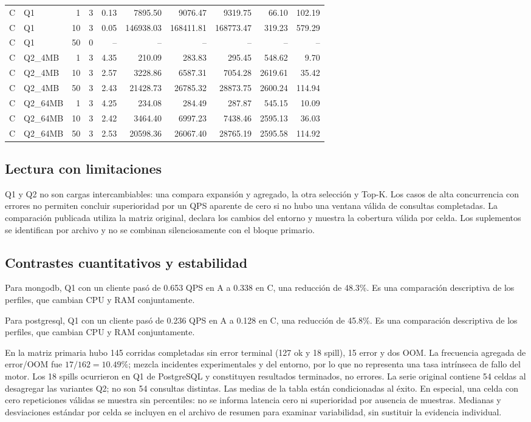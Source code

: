 \documentclass[11pt,letterpaper]{article}
\begin{document}
{\begin{longtable}{llrrrrrrrr}
C & Q1 & 1 & 3 & 0.13 & 7895.50 & 9076.47 & 9319.75 & 66.10 & 102.19\\
C & Q1 & 10 & 3 & 0.05 & 146938.03 & 168411.81 & 168773.47 & 319.23 & 579.29\\
C & Q1 & 50 & 0 & -- & -- & -- & -- & -- & --\\
C & Q2\_4MB & 1 & 3 & 4.35 & 210.09 & 283.83 & 295.45 & 548.62 & 9.70\\
C & Q2\_4MB & 10 & 3 & 2.57 & 3228.86 & 6587.31 & 7054.28 & 2619.61 & 35.42\\
C & Q2\_4MB & 50 & 3 & 2.43 & 21428.73 & 26785.32 & 28873.75 & 2600.24 & 114.94\\
C & Q2\_64MB & 1 & 3 & 4.25 & 234.08 & 284.49 & 287.87 & 545.15 & 10.09\\
C & Q2\_64MB & 10 & 3 & 2.42 & 3464.40 & 6997.23 & 7438.46 & 2595.13 & 36.03\\
C & Q2\_64MB & 50 & 3 & 2.53 & 20598.36 & 26067.40 & 28765.19 & 2595.58 & 114.92\\
\end{longtable}}
\subsection{Lectura con limitaciones}
Q1 y Q2 no son cargas intercambiables: una compara expansión y agregado, la otra selección y Top-K. Los casos de alta concurrencia con errores no permiten concluir superioridad por un QPS aparente de cero si no hubo una ventana válida de consultas completadas. La comparación publicada utiliza la matriz original, declara los cambios del entorno y muestra la cobertura válida por celda. Los suplementos se identifican por archivo y no se combinan silenciosamente con el bloque primario.
\subsection{Contrastes cuantitativos y estabilidad}
Para mongodb, Q1 con un cliente pasó de 0.653 QPS en A a 0.338 en C, una reducción de 48.3\%. Es una comparación descriptiva de los perfiles, que cambian CPU y RAM conjuntamente.

Para postgresql, Q1 con un cliente pasó de 0.236 QPS en A a 0.128 en C, una reducción de 45.8\%. Es una comparación descriptiva de los perfiles, que cambian CPU y RAM conjuntamente.

En la matriz primaria hubo 145 corridas completadas sin error terminal (127 ok y 18 spill), 15 error y dos OOM. La frecuencia agregada de error/OOM fue $17/162=10.49\%$; mezcla incidentes experimentales y del entorno, por lo que no representa una tasa intrínseca de fallo del motor. Los 18 spills ocurrieron en Q1 de PostgreSQL y constituyen resultados terminados, no errores. La serie original contiene 54 celdas al desagregar las variantes Q2; no son 54 consultas distintas.
Las medias de la tabla están condicionadas al éxito. En especial, una celda con cero repeticiones válidas se muestra sin percentiles: no se informa latencia cero ni superioridad por ausencia de muestras. Medianas y desviaciones estándar por celda se incluyen en el archivo de resumen para examinar variabilidad, sin sustituir la evidencia individual.
\end{document}
